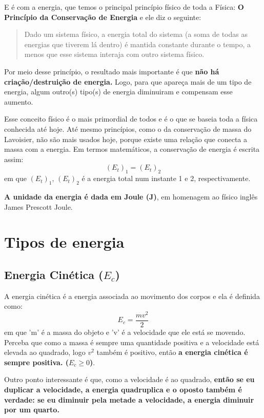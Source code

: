 \documentclass[12pt]{extarticle}
\newcommand{\<}{\langle}
\renewcommand{\>}{\rangle}
\theoremstyle{definition}
\begin{document}
E é com a energia, que temos o principal princípio físico de toda a Física: \textbf{O Princípio da Conservação de Energia} e ele diz o seguinte:
\begin{quote}
    Dado um sistema físico, a energia total do sistema (a soma de todas as energias que tiverem lá dentro) é mantida constante durante o tempo, a menos que esse sistema interaja com outro sistema físico.
\end{quote}

Por meio desse princípio, o resultado mais importante é que \textbf{não há criação/destruição de energia.} Logo, para que apareça mais de um tipo de energia, algum outro(s) tipo(s) de energia diminuiram e compensam esse aumento.

Esse conceito físico é o mais primordial de todos e é o que se baseia toda a física conhecida até hoje. Até mesmo princípios, como o da conservação de massa do Lavoisier, não são mais usados hoje, porque existe uma relação que conecta a massa com a energia. Em termos matemáticos, a conservação de energia é escrita assim:
\begin{equation}
    (E_t)_1 = (E_t)_2
\end{equation}
\noindent em que $(E_t)_1,\,(E_t)_2$ é a energia total num instante 1 e 2, respectivamente.

\textbf{A unidade da energia é dada em Joule (J)}, em homenagem ao físico inglês James Prescott Joule.

\section{Tipos de energia}
\subsection{Energia Cinética ($E_c$)}
A energia cinética é a energia associada ao movimento dos corpos e ela é definida como:
\begin{equation}
    E_{c} = \frac{mv^2}{2}
\end{equation}
\noindent em que 'm' é a massa do objeto e 'v' é a velocidade que ele está se movendo. Perceba que como a massa é sempre uma quantidade positiva e a velocidade está elevada ao quadrado, logo $v^2$ também é positivo, então \textbf{a energia cinética é sempre positiva. ($E_c\geq 0$)}.

Outro ponto interessante é que, como a velocidade é ao quadrado, \textbf{então se eu duplicar a velocidade, a energia quadruplica e o oposto também é verdade: se eu diminuir pela metade a velocidade, a energia diminuir por um quarto.}
\end{document}
